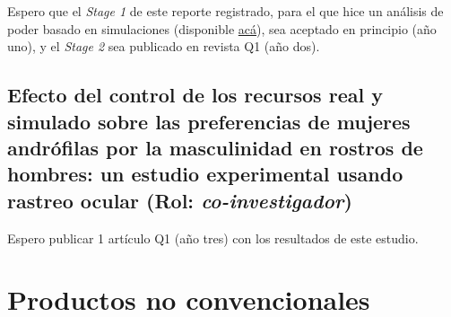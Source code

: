 \documentclass[11pt,a4paper,]{awesome-cv}
\begin{document}
\begin{footnotesize}

Espero que el \textit{Stage 1} de este reporte registrado, para el que hice un análisis de poder basado en simulaciones (disponible \href{https://github.com/comp-music-lab/VisualEars/blob/main/Power_Analysis/Power_analysis.pdf}{acá}), sea aceptado en principio (año uno), y el \textit{Stage 2} sea publicado en revista Q1 (año dos).

\end{footnotesize}

\hypertarget{efecto-del-control-de-los-recursos-real-y-simulado-sobre-las-preferencias-de-mujeres-andruxf3filas-por-la-masculinidad-en-rostros-de-hombres-un-estudio-experimental-usando-rastreo-ocular-rol-co-investigador}{%
\subsection{\texorpdfstring{Efecto del control de los recursos real y
simulado sobre las preferencias de mujeres andrófilas por la
masculinidad en rostros de hombres: un estudio experimental usando
rastreo ocular (Rol:
\emph{co-investigador})}{Efecto del control de los recursos real y simulado sobre las preferencias de mujeres andrófilas por la masculinidad en rostros de hombres: un estudio experimental usando rastreo ocular (Rol: co-investigador)}}\label{efecto-del-control-de-los-recursos-real-y-simulado-sobre-las-preferencias-de-mujeres-andruxf3filas-por-la-masculinidad-en-rostros-de-hombres-un-estudio-experimental-usando-rastreo-ocular-rol-co-investigador}}

\begin{footnotesize}

Espero publicar 1 artículo Q1 (año tres) con los resultados de este estudio.

\end{footnotesize}

\hypertarget{productos-no-convencionales}{%
\section{Productos no
convencionales}\label{productos-no-convencionales}}
\end{document}
